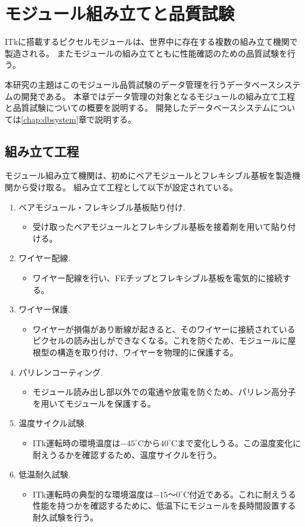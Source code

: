 \chapter{モジュール組み立てと品質試験} \label{chap:qc_test}
ITkに搭載するピクセルモジュールは、世界中に存在する複数の組み立て機関で製造される。
またモジュールの組み立てともに性能確認のための品質試験を行う。

本研究の主題はこのモジュール品質試験のデータ管理を行うデータベースシステムの開発である。
本章ではデータ管理の対象となるモジュールの組み立て工程と品質試験についての概要を説明する。
開発したデータベースシステムについては\ref{chap:dbsystem}章で説明する。

\section{組み立て工程}\label{sec:assembly}
モジュール組み立て機関は、初めにベアモジュールとフレキシブル基板を製造機関から受け取る。
組み立て工程として以下が設定されている。
\begin{enumerate}
  \item ベアモジュール・フレキシブル基板貼り付け.
  \begin{itemize}
    \item 受け取ったベアモジュールとフレキシブル基板を接着剤を用いて貼り付ける。
  \end{itemize}
  \item ワイヤー配線.
  \begin{itemize}
    \item ワイヤー配線を行い、FEチップとフレキシブル基板を電気的に接続する。
  \end{itemize}
  \item ワイヤー保護.
  \begin{itemize}
    \item ワイヤーが損傷があり断線が起きると、そのワイヤーに接続されているピクセルの読み出しができなくなる。これを防ぐため、モジュールに屋根型の構造を取り付け、ワイヤーを物理的に保護する。
  \end{itemize}
  \item パリレンコーティング.
  \begin{itemize}
    \item モジュール読み出し部以外での電通や放電を防ぐため、パリレン高分子を用いてモジュールを保護する。
  \end{itemize}
  \item 温度サイクル試験.
  \begin{itemize}
    \item ITk運転時の環境温度は$-45^\circ$Cから$40^\circ$Cまで変化しうる\cite{3-2}。この温度変化に耐えうるかを確認するため、温度サイクルを行う。
  \end{itemize}
  \item 低温耐久試験.
  \begin{itemize}
    \item ITk運転時の典型的な環境温度は$-15〜0^\circ$C付近である。これに耐えうる性能を持つかを確認するために、低温下にモジュールを長時間設置する耐久試験を行う。
  \end{itemize}
\end{enumerate}

